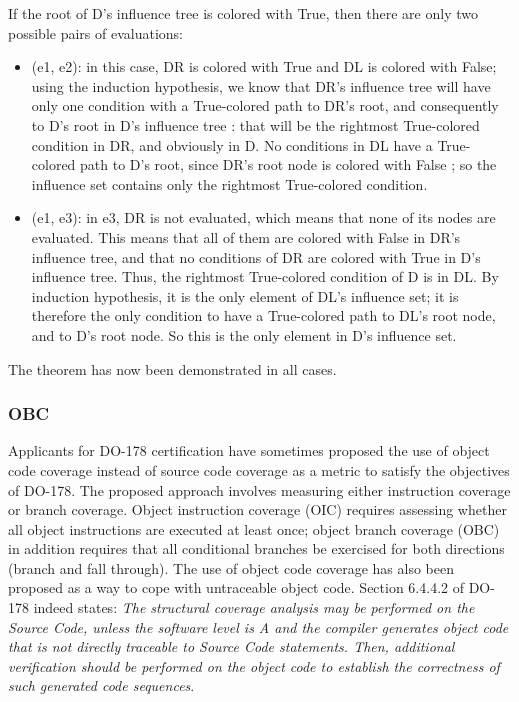 \documentclass[a4paper,12pt,twoside]{article}
\begin{document}
\begin{itemize}
If the root of D's influence tree is colored with True, then there are only
two possible pairs of evaluations:

\begin{itemize}
\item (e1, e2): in this case, DR is colored with True and DL is colored with
False; using the induction hypothesis, we know that DR's influence tree
will have only one condition with a True-colored path to DR's root, and
consequently to D's root in D's influence tree : that will be the rightmost
True-colored condition in DR, and obviously in D. No conditions in DL
have a True-colored path to D's root, since DR's root node is colored with
False ; so the influence set contains only the rightmost True-colored
condition.
\item (e1, e3): in e3, DR is not evaluated, which means that none of its
nodes are evaluated. This means that all of them are colored with
False in DR's influence tree, and that no conditions of DR are colored
with True in D's influence tree. Thus, the rightmost True-colored condition
of D is in DL. By induction hypothesis, it is the only element of DL's
influence set; it is therefore the only condition to have a True-colored
path to DL's root node, and to D's root node. So this is the only element
in D's influence set.
\end{itemize}

\end{itemize}

The theorem has now been demonstrated in all cases.

\subsubsection{OBC}

Applicants for DO-178 certification have sometimes proposed the use of object
code coverage instead of source code coverage as a metric to satisfy the
objectives of DO-178. The proposed approach involves measuring either
instruction coverage or branch coverage. Object instruction coverage
(OIC) requires assessing whether all object instructions are executed
at least once; object branch coverage (OBC) in addition requires that
all conditional branches be exercised for both directions (branch and
fall through). The use of object code coverage has also been proposed
as a way to cope with untraceable object code. Section 6.4.4.2 of
DO-178 indeed states: \emph{The structural coverage analysis may be
performed on the Source Code, unless the software level is A and the
compiler generates object code that is not directly traceable to Source
Code statements. Then, additional verification should be performed on
the object code to establish the correctness of such generated code
sequences}.
\end{document}
